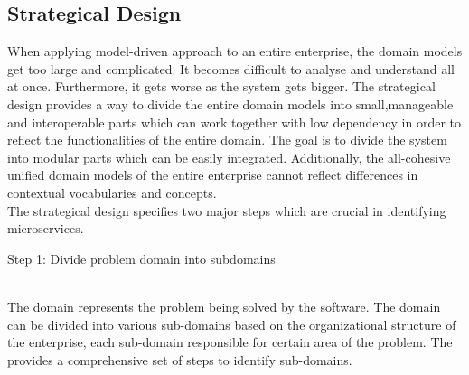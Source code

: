 \subsection{Strategical Design}\label{section:domain_driven_design/process_to_domain_driven_design/strategical_design}
When applying model-driven approach to an entire enterprise, the domain models get too large and complicated. It becomes difficult to analyse and understand all at once. Furthermore, it gets worse as the system gets bigger. The strategical design provides a way to divide the entire domain models into small,manageable and interoperable parts which can work together with low dependency in order to reflect the functionalities of the entire domain. The goal is to divide the system into modular parts which can be easily integrated. Additionally, the all-cohesive unified domain models of the entire enterprise cannot reflect differences in contextual vocabularies and concepts.\cite{Fowler:2014ab}\cite{Evans:2003aa}\cite{Vernon:2013aa}
\\
The strategical design specifies two major steps which are crucial in identifying microservices.
\\
\begin{shaded}Step 1: Divide problem domain into subdomains \end{shaded} \label{section:domain_driven_design/process_to_domain_driven_design/strategical_design/step_1}
\\
The domain represents the problem being solved by the software. The domain can be divided into various sub-domains based on the organizational structure of the enterprise, each sub-domain responsible for certain area of the problem. The \cite{Engels:2015aa} provides a comprehensive set of steps to identify sub-domains.
